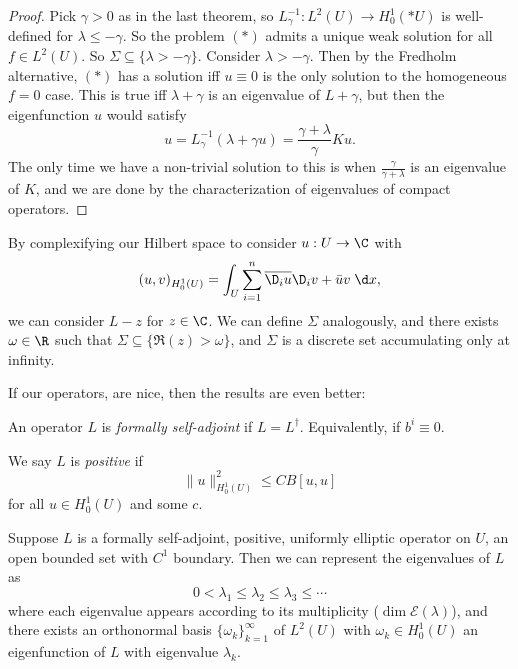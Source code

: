 \documentclass[a4paper]{article}
\begin{document}
\begin{proof}
  Pick $\gamma > 0$ as in the last theorem, so $L_\gamma^{-1}: L^2(U) \to H_0^1(*U)$ is well-defined for $\lambda \leq -\gamma$. So the problem $(*)$ admits a unique weak solution for all $f \in L^2(U)$. So $\Sigma \subseteq \{\lambda > - \gamma\}$. Consider $\lambda > -\gamma$. Then by the Fredholm alternative, $(*)$ has a solution iff $u \equiv 0$ is the only solution to the homogeneous $f = 0$ case. This is true iff $\lambda + \gamma$ is an eigenvalue of $L + \gamma$, but then the eigenfunction $u$ would satisfy
  \[
    u = L_\gamma^{-1}(\lambda + \gamma u) = \frac{\gamma + \lambda}{\gamma }Ku.
  \]
  The only time we have a non-trivial solution to this is when $\frac{\gamma}{\gamma + \lambda}$ is an eigenvalue of $K$, and we are done by the characterization of eigenvalues of compact operators.
\end{proof}

By complexifying our Hilbert space to consider $u: U \to \C$ with
\[
  (u, v)_{H_0^1(U)} = \int_U \sum_{i = 1}^n \overline{\D_i u} \D_i v + \bar{u} v \;\d x,
\]
we can consider $L - z$ for $z \in \C$. We can define $\Sigma$ analogously, and there exists $\omega \in \R$ such that $\Sigma \subseteq \{\Re (z) > \omega\}$, and $\Sigma$ is a discrete set accumulating only at infinity.

If our operators, are nice, then the results are even better:
\begin{defi}
  An operator $L$ is \emph{formally self-adjoint} if $L = L^\dagger$. Equivalently, if $b^i \equiv 0$.
\end{defi}

\begin{defi}
  We say $L$ is \emph{positive} if
  \[
    \|u\|^2_{H_0^1(U)} \leq C B[u, u]
  \]
  for all $u \in H_0^1(U)$ and some $c$.
\end{defi}

\begin{thm}
  Suppose $L$ is a formally self-adjoint, positive, uniformly elliptic operator on $U$, an open bounded set with $C^1$ boundary. Then we can represent the eigenvalues of $L$ as
  \[
    0 < \lambda_1 \leq \lambda_2 \leq \lambda_3 \leq \cdots
  \]
  where each eigenvalue appears according to its multiplicity ($\dim \mathcal{E}(\lambda)$), and there exists an orthonormal basis $\{\omega_k\}_{k = 1}^\infty$ of $L^2(U)$ with $\omega_k \in H_0^1(U)$ an eigenfunction of $L$ with eigenvalue $\lambda_k$.
\end{thm}
\end{document}
